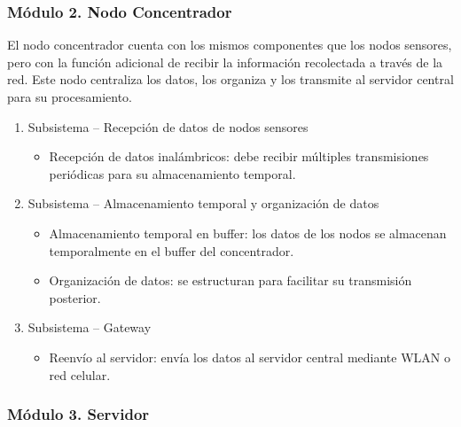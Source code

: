 \subsubsection*{Módulo 2. Nodo Concentrador}

El nodo concentrador cuenta con los mismos componentes que los nodos sensores, pero con la función adicional de recibir la información recolectada a través de la red. Este nodo centraliza los datos, los organiza y los transmite al servidor central para su procesamiento.

\begin{enumerate}
    \item Subsistema – Recepción de datos de nodos sensores
    \begin{itemize}
        \item Recepción de datos inalámbricos: debe recibir múltiples transmisiones periódicas para su almacenamiento temporal.
    \end{itemize}

    \item Subsistema – Almacenamiento temporal y organización de datos
    \begin{itemize}
        \item Almacenamiento temporal en buffer: los datos de los nodos se almacenan temporalmente en el buffer del concentrador.
        \item Organización de datos: se estructuran para facilitar su transmisión posterior.
    \end{itemize}

    \item Subsistema – Gateway
    \begin{itemize}
        \item Reenvío al servidor: envía los datos al servidor central mediante WLAN o red celular.
    \end{itemize}
\end{enumerate}

\subsubsection*{Módulo 3. Servidor}

